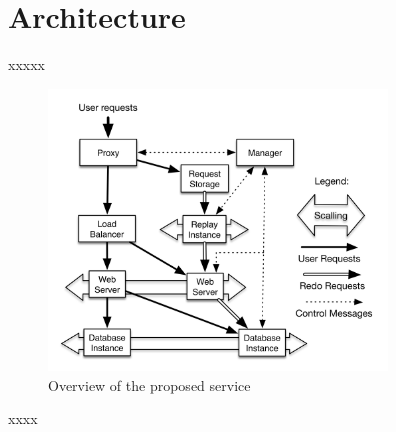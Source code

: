 \section{Architecture}
\label{sec:Architecture}


xxxxx



\begin{figure}
  \centering
  \includegraphics[width=90mm]{images/architectureTiers}
  \caption{Overview of the proposed service}
  \label{architecture}
\end{figure}

xxxx